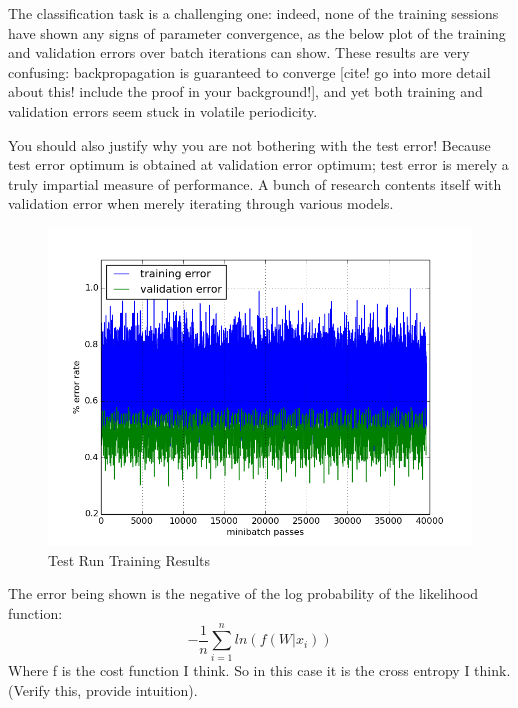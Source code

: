 \documentclass[a4paper,11pt]{article}
\begin{document}
The classification task is a challenging one: indeed, none of the training sessions have shown any signs of parameter convergence, as the below plot of the training and validation errors over batch iterations can show. These results are very confusing: backpropagation is guaranteed to converge [cite! go into more detail about this! include the proof in your background!], and yet both training and validation errors seem stuck in volatile periodicity.

You should also justify why you are not bothering with the test error! Because test error optimum is obtained at validation error optimum; test error is merely a truly impartial measure of performance. A bunch of research contents itself with validation error when merely iterating through various models. 

\begin{figure}[h!]
	\centering
	\includegraphics[scale=0.5]{images/test_run.png}
	\caption{Test Run Training Results}
\end{figure}

The error being shown is the negative of the log probability of the likelihood function:
\begin{equation}
-\frac{1}{n}\sum\limits_{i=1}^n ln(f(W|x_i))
\end{equation}
Where f is the cost function I think. So in this case it is the cross entropy I think. (Verify this, provide intuition).\\
\end{document}
